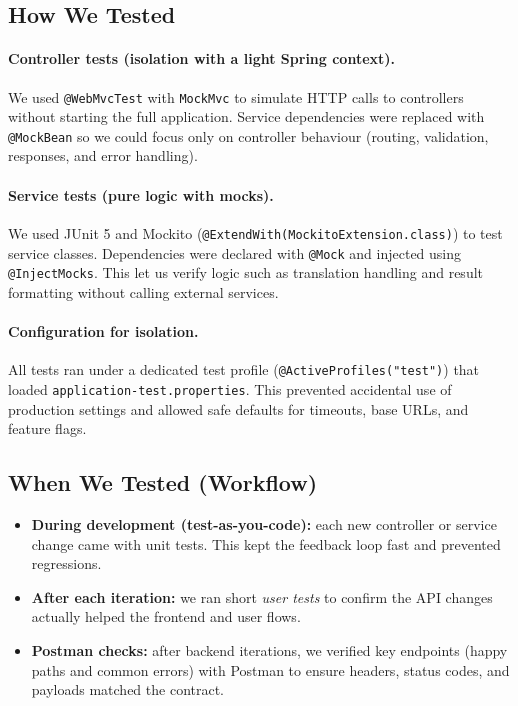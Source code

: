 \subsection{How We Tested}
\paragraph{Controller tests (isolation with a light Spring context).}
We used \texttt{@WebMvcTest} with \texttt{MockMvc} to simulate HTTP calls to controllers without starting the full application. Service dependencies were replaced with \texttt{@MockBean} so we could focus only on controller behaviour (routing, validation, responses, and error handling).

\paragraph{Service tests (pure logic with mocks).}
We used JUnit 5 and Mockito (\texttt{@ExtendWith(MockitoExtension.class)}) to test service classes. Dependencies were declared with \texttt{@Mock} and injected using \texttt{@InjectMocks}. This let us verify logic such as translation handling and result formatting without calling external services.

\paragraph{Configuration for isolation.}
All tests ran under a dedicated test profile (\texttt{@ActiveProfiles("test")}) that loaded \texttt{application-test.properties}. This prevented accidental use of production settings and allowed safe defaults for timeouts, base URLs, and feature flags.

\subsection{When We Tested (Workflow)}
\begin{itemize} \itemsep0pt \parskip0pt
    \item \textbf{During development (test-as-you-code):} each new controller or service change came with unit tests. This kept the feedback loop fast and prevented regressions.
    \item \textbf{After each iteration:} we ran short \emph{user tests} to confirm the API changes actually helped the frontend and user flows.
    \item \textbf{Postman checks:} after backend iterations, we verified key endpoints (happy paths and common errors) with Postman to ensure headers, status codes, and payloads matched the contract.
\end{itemize}

